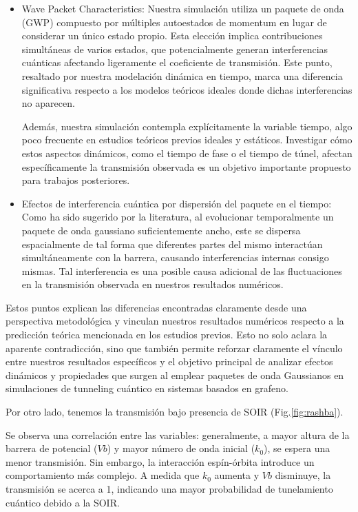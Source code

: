 \begin{itemize}
    \item Wave Packet Characteristics:
    Nuestra simulación utiliza un paquete de onda (GWP) compuesto por múltiples autoestados de momentum en lugar de considerar un único estado propio.
    Esta elección implica contribuciones simultáneas de varios estados, que potencialmente generan interferencias cuánticas afectando ligeramente el coeficiente de transmisión\cite{Staelens2021}.
    Este punto, resaltado por nuestra modelación dinámica en tiempo, marca una diferencia significativa respecto a los modelos teóricos ideales donde dichas interferencias no aparecen.

    Además, nuestra simulación contempla explícitamente la variable tiempo, algo poco frecuente en estudios teóricos previos ideales y estáticos.
    Investigar cómo estos aspectos dinámicos, como el tiempo de fase o el tiempo de túnel, afectan específicamente la transmisión observada es un objetivo importante propuesto para trabajos posteriores.

    \item Efectos de interferencia cuántica por dispersión del paquete en el tiempo:
    Como ha sido sugerido por la literatura\cite{MolgadoMex2018}, al evolucionar temporalmente un paquete de onda gaussiano suficientemente ancho, este se dispersa espacialmente de tal forma que diferentes partes del mismo interactúan simultáneamente con la barrera, causando interferencias internas consigo mismas.
    Tal interferencia es una posible causa adicional de las fluctuaciones en la transmisión observada en nuestros resultados numéricos.
\end{itemize}

Estos puntos explican las diferencias encontradas claramente desde una perspectiva metodológica y vinculan nuestros resultados numéricos respecto a la predicción teórica mencionada en los estudios previos.
Esto no solo aclara la aparente contradicción, sino que también permite reforzar claramente el vínculo entre nuestros resultados específicos y el objetivo principal de analizar efectos dinámicos y propiedades que surgen al emplear paquetes de onda Gaussianos en simulaciones de tunneling cuántico en sistemas basados en grafeno.

Por otro lado, tenemos la transmisión bajo presencia de SOIR (Fig.\ref{fig:rashba}).

Se observa una correlación entre las variables: generalmente, a mayor altura de la barrera de potencial ($Vb$) y mayor número de onda inicial ($k_0$), se espera una menor transmisión.
Sin embargo, la interacción espín-órbita introduce un comportamiento más complejo.
A medida que $k_0$ aumenta y $Vb$ disminuye, la transmisión se acerca a 1, indicando una mayor probabilidad de tunelamiento cuántico debido a la SOIR\@.

